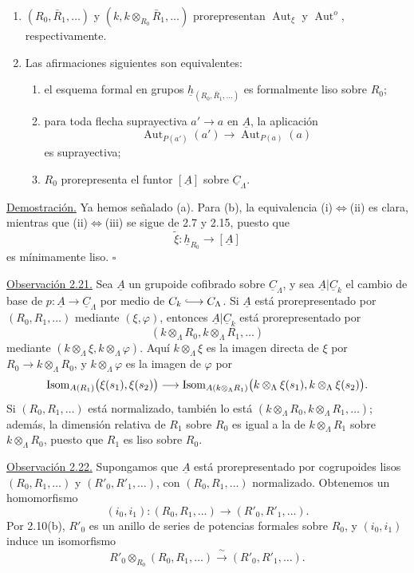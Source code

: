 \begin{enumerate}[label=(\alph*)]
\item $(R_0,\bar R_1,\ldots)$ y
$(k,k\otimes_{R_0}\bar R_1,\ldots)$ prorepresentan
$\operatorname{Aut}_\xi$ y $\operatorname{Aut}^{o}$, respectivamente.

\item Las afirmaciones siguientes son equivalentes:
\begin{enumerate}[label=(\roman*)]
\item el esquema formal en grupos
$\underline h_{(R_0,\bar R_1,\ldots)}$ es formalmente liso sobre $R_0$;
\item para toda flecha suprayectiva $a'\longrightarrow a$ en
$\underline A$, la aplicación
\[
 \operatorname{Aut}_{P(a')}(a')\longrightarrow
 \operatorname{Aut}_{P(a)}(a)
\]
es suprayectiva;
\item $R_0$ prorepresenta el funtor $[\underline A]$ sobre
$\underline C_\Lambda$.
\end{enumerate}
\end{enumerate}


\underline{Demostración.} Ya hemos señalado (a). Para (b), la
equivalencia (i)$\Leftrightarrow$(ii) es clara, mientras que
(ii)$\Leftrightarrow$(iii) se sigue de 2.7 y 2.15, puesto que
\[
 \widetilde\xi:\underline h_{R_0}\longrightarrow[\underline A]
\]
es mínimamente liso. \hfill$\square$

\underline{Observación 2.21.} Sea $\underline A$ un grupoide cofibrado
sobre $\underline C_\Lambda$, y sea
$\underline A|\underline C_k$ el cambio de base de
$p:\underline A\longrightarrow\underline C_\Lambda$ por medio de
$\underline C_k\lhook\joinrel\longrightarrow\underline C_\Lambda$.
Si $\underline A$ está prorepresentado por $(R_0,R_1,\ldots)$ mediante
$(\xi,\varphi)$, entonces $\underline A|\underline C_k$ está
prorepresentado por
\[
 (k\otimes_\Lambda R_0,k\otimes_\Lambda R_1,\ldots)
\]
mediante $(k\otimes_\Lambda\xi,k\otimes_\Lambda\varphi)$. Aquí
$k\otimes_\Lambda\xi$ es la imagen directa de $\xi$ por
$R_0\longrightarrow k\otimes_\Lambda R_0$, y
$k\otimes_\Lambda\varphi$ es la imagen de $\varphi$ por
\[
 \operatorname{Isom}_{\underline A(\sisi{R_0}{R_1})}
   \bigl(\xi(s_1),\xi(s_2)\bigr)
 \longrightarrow
 \operatorname{Isom}_{\underline A(k\otimes_\Lambda R_1)}
   \bigl(k\otimes_\Lambda\xi(s_1),
         k\otimes_\Lambda\xi(s_2)\bigr).
\]
Si $(R_0,R_1,\ldots)$ está normalizado, también lo está
$(k\otimes_\Lambda R_0,k\otimes_\Lambda R_1,\ldots)$; además, la
dimensión relativa de $R_1$ sobre $R_0$ es igual a la de
$k\otimes_\Lambda R_1$ sobre $k\otimes_\Lambda R_0$, puesto que $R_1$ es
liso sobre $R_0$.

\underline{Observación 2.22.} Supongamos que $\underline A$ está
prorepresentado por cogrupoides lisos $(R_0,R_1,\ldots)$ y
$(R'_0,R'_1,\ldots)$, con $(R_0,R_1,\ldots)$ normalizado. Obtenemos un
homomorfismo
\[
 (i_0,i_1):(R_0,R_1,\ldots)\longrightarrow(R'_0,R'_1,\ldots).
\]
Por 2.10(b), $R'_0$ es un anillo de series de potencias formales sobre
$R_0$, y $(i_0,i_1)$ induce un isomorfismo
\[
 R'_0\otimes_{R_0}(R_0,R_1,\ldots)
 \xrightarrow{\ \sim\ }(R'_0,R'_1,\ldots).
\]
